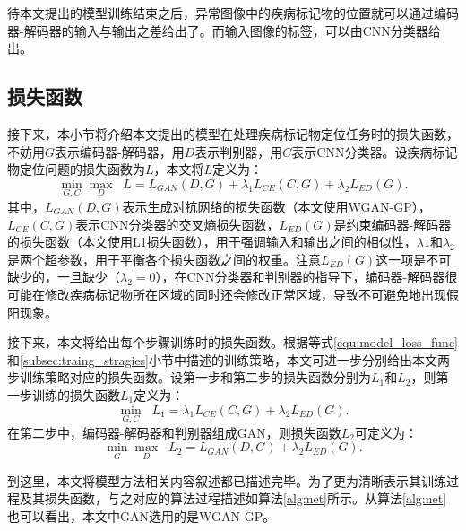 待本文提出的模型训练结束之后，异常图像中的疾病标记物的位置就可以通过编码器-解码器的输入与输出之差给出了。而输入图像的标签，可以由CNN分类器给出。
\subsection{损失函数}\label{subsec:loss_func}
接下来，本小节将介绍本文提出的模型在处理疾病标记物定位任务时的损失函数，不妨用$G$表示编码器-解码器，用$D$表示判别器，用$C$表示CNN分类器。设疾病标记物定位问题的损失函数为${L}$，本文将$L$定义为：
\begin{equation}\label{equ:model_loss_func}
\min _{G, C} \max _{D} \;\; L=L_{GAN}(D, G)+\lambda_{1} L_{C E}(C, G)+\lambda_{2} L_{E D}(G).
\end{equation}
其中，$L_{GAN}(D,G)$表示生成对抗网络的损失函数（本文使用WGAN-GP），$L_{CE}(C, G)$表示CNN分类器的交叉熵损失函数，$L_{E D}(G)$是约束编码器-解码器的损失函数（本文使用L1损失函数），用于强调输入和输出之间的相似性，$\lambda{1}$和$\lambda_{2}$是两个超参数，用于平衡各个损失函数之间的权重。注意$L_{E D}(G)$这一项是不可缺少的，一旦缺少（$\lambda_{2}=0$），在CNN分类器和判别器的指导下，编码器-解码器很可能在修改疾病标记物所在区域的同时还会修改正常区域，导致不可避免地出现假阳现象。

接下来，本文将给出每个步骤训练时的损失函数。根据等式\ref{equ:model_loss_func}和\ref{subsec:traing_stragies}小节中描述的训练策略，本文可进一步分别给出本文两步训练策略对应的损失函数。设第一步和第二步的损失函数分别为$L_1$和$L_2$，则第一步训练的损失函数$L_1$定义为：
\begin{equation}
\min_{G, C} \;\; L_{1}=\lambda_1 L_{CE}(C,G) + \lambda_2 L_{ED}(G).
\end{equation}
在第二步中，编码器-解码器和判别器组成GAN，则损失函数$L_2$可定义为：
\begin{equation}
\min_{G} \max_D \;\; L_{2}= L_{GAN}(D,G) + \lambda_2 L_{ED}(G).
\end{equation}

到这里，本文将模型方法相关内容叙述都已描述完毕。为了更为清晰表示其训练过程及其损失函数，与之对应的算法过程描述如算法\ref{alg:net}所示。从算法\ref{alg:net}也可以看出，本文中GAN选用的是WGAN-GP。

